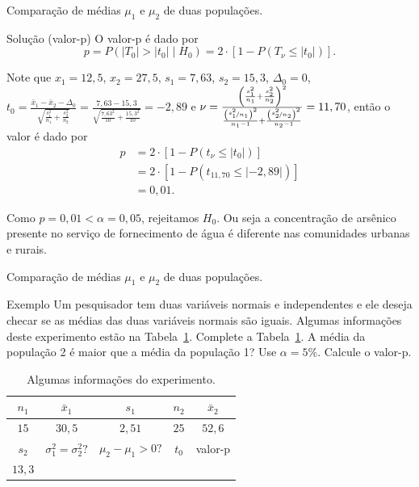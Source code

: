 \documentclass[9pt]{beamer}
\begin{document}
\begin{frame}{Comparação de médias $\mu_1$ e $\mu_2$ de duas populações.}

\begin{block}{Solução (valor-p)}
	O valor-p é dado por
	$$p = P(\lvert T_0 \rvert > \lvert t_0 \rvert  \mid H_0) = 2 \cdot \left[1 - P(T_\nu \leq \lvert t_0 \rvert)\right].$$
	
	Note que $x_1=12,5$, $x_2=27,5$, $s_1=7,63$, $s_2=15,3$, $\Delta_0=0$, $t_0 = \frac{\bar{x}_1 - \bar{x}_2 - \Delta_0}{\sqrt{\frac{s_1^2}{n_1} + \frac{s_2^2}{n_2}}} = \frac{7,63 - 15,3}{\sqrt{\frac{7,63^2}{10} + \frac{15,3^2}{10}}}=-2,89$ e $\nu = \frac{\left(\frac{s_1^2}{n_1} + \frac{s_2^2}{n_2} \right)^2}{\frac{\left(\nicefrac{s_1^2}{n_1}\right)^2}{n_1-1} + \frac{\left(\nicefrac{s_2^2}{n_2}\right)^2}{n_2-1}} = 11,70$, então o valor é dado por
	\begin{align*}
	p &=2\cdot \left[1- P(t_\nu \leq \lvert  t_0\rvert)\right]\\
	&=2\cdot \left[1- P(t_{11,70} \leq \lvert -2,89 \rvert)\right]\\
	&= 0,01.
	\end{align*}
	
	Como $p = 0,01 < \alpha=0,05$, rejeitamos $H_0$. Ou seja a concentração de arsênico presente no serviço de fornecimento de água é diferente nas comunidades urbanas e rurais.
\end{block}

\end{frame}

\begin{frame}{Comparação de médias $\mu_1$ e $\mu_2$ de duas populações.}

\begin{block}{Exemplo}
	Um pesquisador tem duas variáveis normais e independentes e ele deseja checar se as médias das duas variáveis normais são iguais. Algumas informações deste experimento estão na Tabela~\ref{tab:experimento-h1-upper}. Complete a Tabela~\ref{tab:experimento-h1-upper}. A média da população 2 é maior que a média da população 1? Use $\alpha=5\%$. Calcule o valor-p.
\end{block}

\begin{table}[htbp]
	\centering
	\begin{tabular}{c|c|c|c|c}
		\toprule[0.1cm]
		$n_1$ & $\bar{x}_1$ & $s_1$ & $n_2$ & $\bar{x}_2$\\ \midrule[0.025cm]
		$15$ & $30,5$ & $2,51$ & $25$ & $52,6$\\ \midrule[0.05cm]
		$s_2$ & $\sigma_1^2 = \sigma_2^2?$ & $\mu_2 - \mu_1 > 0?$ & $t_0$ & valor-p\\ \midrule[0.025cm]
		$13,3$ & & & & \\ \bottomrule[0.1cm]
	\end{tabular}
	\caption{Algumas informações do experimento.}
	\label{tab:experimento-h1-upper}
\end{table}

\end{frame}
\end{document}
